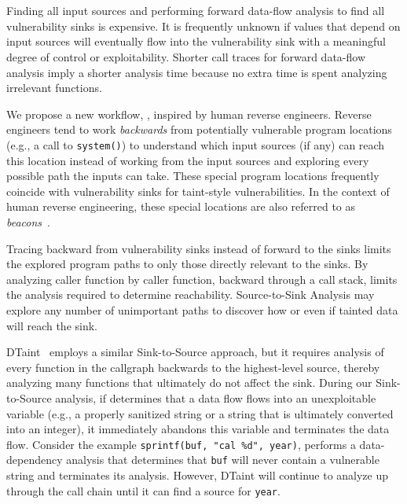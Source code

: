 \section{\rev}
\label{sec:rev}



Finding all input sources and performing forward data-flow analysis to find all vulnerability sinks is expensive. 
It is frequently unknown if values that depend on input sources will eventually flow into the vulnerability sink with a meaningful degree of control or exploitability.
Shorter call traces for forward data-flow analysis imply a shorter analysis time because no extra time is spent analyzing irrelevant functions.

We propose a new workflow, \rev, inspired by human reverse engineers.
Reverse engineers tend to work \emph{backwards} from potentially vulnerable program locations (e.g., a call to \texttt{system()}) to understand which input sources (if any) can reach this location instead of working from the input sources and exploring every possible path the inputs can take.
These special program locations frequently coincide with vulnerability sinks for taint-style vulnerabilities.
In the context of human reverse engineering, these special locations are also referred to as \emph{beacons}~\cite{votipka2019observational}.

Tracing backward from vulnerability sinks instead of forward to the sinks limits the explored program paths to only those directly relevant to the sinks.
By analyzing caller function by caller function, backward through a call stack, \rev limits the analysis required to determine reachability.
Source-to-Sink Analysis may explore any number of unimportant paths to discover how or even if tainted data will reach the sink.

DTaint~\cite{cheng2018dtaint} employs a similar Sink-to-Source approach, but it requires analysis of every function in the callgraph backwards to the highest-level source, thereby analyzing many functions that ultimately do not affect the sink.
During our Sink-to-Source analysis, if \rda determines that a data flow flows into an unexploitable variable (e.g., a properly sanitized string or a string that is ultimately converted into an integer), it immediately abandons this variable and terminates the data flow.
Consider the example \texttt{sprintf(buf, "cal \%d", year)}, \rda performs a data-dependency analysis that determines that \texttt{buf} will never contain a vulnerable string and terminates its analysis. 
However, DTaint will continue to analyze up through the call chain until it can find a source for \texttt{year}. 

